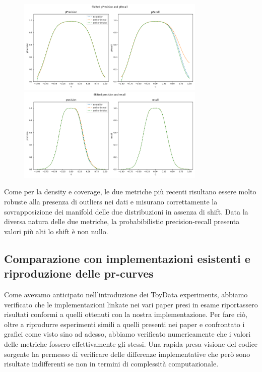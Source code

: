 \begin{figure}[h!]
    \centering
    \includegraphics[width=0.8\textwidth]{../images/toyexperiments/outliers/shift_pPrecision_pRecall.png} 
    \includegraphics[width=0.8\textwidth]{../images/toyexperiments/outliers/shift_precision_recall.png} 
\end{figure}

Come per la density e coverage, le due metriche più recenti risultano essere molto robuste alla presenza di outliers nei dati e misurano correttamente la sovrapposizione dei manifold delle due distribuzioni in assenza di shift.
Data la diversa natura delle due metriche, la probabibilistic precision-recall presenta valori più alti lo shift è non nullo.

\subsection{Comparazione con implementazioni esistenti e riproduzione delle pr-curves}

Come avevamo anticipato nell'introduzione dei ToyData experiments, abbiamo verificato che le implementazioni linkate nei vari paper presi in esame riportassero risultati conformi a quelli ottenuti con la nostra implementazione.
Per fare ciò, oltre a riprodurre esperimenti simili a quelli presenti nei paper e confrontato i grafici come visto sino ad adesso, abbiamo verificato numericamente che i valori delle metriche fossero effettivamente gli stessi.
Una rapida presa visione del codice sorgente ha permesso di verificare delle differenze implementative che però sono risultate indifferenti se non in termini di complessità computazionale.

